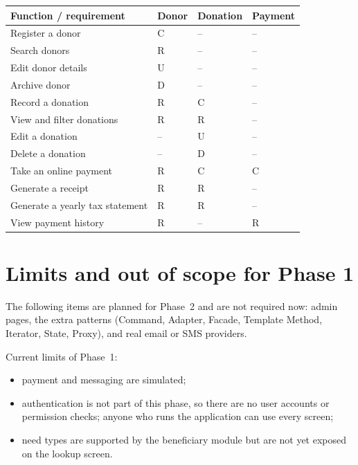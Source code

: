 \begin{center}
\footnotesize
\begin{tabularx}{\textwidth}{@{}YL{0.12\textwidth}L{0.14\textwidth}L{0.14\textwidth}@{}}
\toprule
\textbf{Function / requirement} & \textbf{Donor} & \textbf{Donation} & \textbf{Payment} \\
\midrule
Register a donor & C & -- & -- \\
Search donors & R & -- & -- \\
Edit donor details & U & -- & -- \\
Archive donor & D & -- & -- \\
Record a donation & R & C & -- \\
View and filter donations & R & R & -- \\
Edit a donation & -- & U & -- \\
Delete a donation & -- & D & -- \\
Take an online payment & R & C & C \\
Generate a receipt & R & R & -- \\
Generate a yearly tax statement & R & R & -- \\
View payment history & R & -- & R \\
\bottomrule
\end{tabularx}
\end{center}

\section{Limits and out of scope for Phase 1}
\label{app:limits}

The following items are planned for Phase~2 and are not required now: admin pages, the extra patterns (Command, Adapter, Facade, Template Method, Iterator, State, Proxy), and real email or SMS providers.

Current limits of Phase~1:

\begin{itemize}
  \item payment and messaging are simulated;
  \item authentication is not part of this phase, so there are no user accounts or permission checks; anyone who runs the application can use every screen;
  \item need types are supported by the beneficiary module but are not yet exposed on the lookup screen.
\end{itemize}
